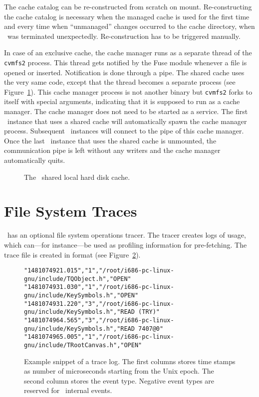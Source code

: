 The cache catalog can be re-constructed from scratch on mount.
Re-constructing the cache catalog is necessary when the managed cache is used for the first time and every time when ``unmanaged'' changes occurred to the cache directory, \eg when \cvmfs\ was terminated unexpectedly.
Re-construction has to be triggered manually.

In case of an exclusive cache, the cache manager runs as a separate thread of the \texttt{cvmfs2} process.
This thread gets notified by the Fuse module whenever a file is opened or inserted.  
Notification is done through a pipe.  
The shared cache uses the very same code, except that the thread becomes a separate process (see Figure~\ref{fig:sharedcache}).  
This cache manager process is not another binary but \texttt{cvmfs2} forks to itself with special arguments, indicating that it is supposed to run as a cache manager.  
The cache manager does not need to be started as a service.  
The first \cvmfs\ instance that uses a shared cache will automatically spawn the cache manager process.  
Subsequent \cvmfs\ instances will connect to the pipe of this cache manager.
Once the last \cvmfs\ instance that uses the shared cache is unmounted, the communication pipe is left without any writers and the cache manager automatically quits.

\begin{figure}
	\centering
	
	\caption{The \cvmfs\ shared local hard disk cache.}
	\label{fig:sharedcache}
\end{figure}


\section{File System Traces}
\cvmfs\ has an optional file system operations tracer.
The tracer creates logs of usage, which can---for instance---be used as profiling information for pre-fetching.
The trace file is created in  format (see Figure~\ref{fig:traces}).
\begin{figure}
	\centering
	\begin{verbatim}
"1481074921.015","1","/root/i686-pc-linux-gnu/include/TQObject.h","OPEN"
"1481074931.030","1","/root/i686-pc-linux-gnu/include/KeySymbols.h","OPEN"
"1481074931.220","3","/root/i686-pc-linux-gnu/include/KeySymbols.h","READ (TRY)"
"1481074964.565","3","/root/i686-pc-linux-gnu/include/KeySymbols.h","READ 7407@0"
"1481074965.005","1","/root/i686-pc-linux-gnu/include/TRootCanvas.h","OPEN"
	\end{verbatim}
	\caption{Example snippet of a trace log. The first columns stores time stamps as number of microseconds starting from the Unix epoch. The second column stores the event type. Negative event types are reserved for \cvmfs\ internal events.}
	\label{fig:traces}
\end{figure}

